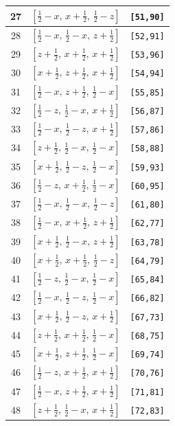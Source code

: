 \documentclass[fleqn,8pt]{jsarticle}
\begin{document}
\begin{longtable}{ccc}
27 & $\left[ \frac{1}{2} - x,\, x + \frac{1}{2},\, \frac{1}{2} - z \right]$ & {\tt [51,90]} \\ \hline
28 & $\left[ \frac{1}{2} - x,\, \frac{1}{2} - x,\, z + \frac{1}{2} \right]$ & {\tt [52,91]} \\ \hline
29 & $\left[ z + \frac{1}{2},\, x + \frac{1}{2},\, x + \frac{1}{2} \right]$ & {\tt [53,96]} \\ \hline
30 & $\left[ x + \frac{1}{2},\, z + \frac{1}{2},\, x + \frac{1}{2} \right]$ & {\tt [54,94]} \\ \hline
31 & $\left[ \frac{1}{2} - x,\, z + \frac{1}{2},\, \frac{1}{2} - x \right]$ & {\tt [55,85]} \\ \hline
32 & $\left[ \frac{1}{2} - z,\, \frac{1}{2} - x,\, x + \frac{1}{2} \right]$ & {\tt [56,87]} \\ \hline
33 & $\left[ \frac{1}{2} - x,\, \frac{1}{2} - z,\, x + \frac{1}{2} \right]$ & {\tt [57,86]} \\ \hline
34 & $\left[ z + \frac{1}{2},\, \frac{1}{2} - x,\, \frac{1}{2} - x \right]$ & {\tt [58,88]} \\ \hline
35 & $\left[ x + \frac{1}{2},\, \frac{1}{2} - z,\, \frac{1}{2} - x \right]$ & {\tt [59,93]} \\ \hline
36 & $\left[ \frac{1}{2} - z,\, x + \frac{1}{2},\, \frac{1}{2} - x \right]$ & {\tt [60,95]} \\ \hline
37 & $\left[ \frac{1}{2} - x,\, \frac{1}{2} - x,\, \frac{1}{2} - z \right]$ & {\tt [61,80]} \\ \hline
38 & $\left[ \frac{1}{2} - x,\, x + \frac{1}{2},\, z + \frac{1}{2} \right]$ & {\tt [62,77]} \\ \hline
39 & $\left[ x + \frac{1}{2},\, \frac{1}{2} - x,\, z + \frac{1}{2} \right]$ & {\tt [63,78]} \\ \hline
40 & $\left[ x + \frac{1}{2},\, x + \frac{1}{2},\, \frac{1}{2} - z \right]$ & {\tt [64,79]} \\ \hline
41 & $\left[ \frac{1}{2} - z,\, \frac{1}{2} - x,\, \frac{1}{2} - x \right]$ & {\tt [65,84]} \\ \hline
42 & $\left[ \frac{1}{2} - x,\, \frac{1}{2} - z,\, \frac{1}{2} - x \right]$ & {\tt [66,82]} \\ \hline
43 & $\left[ x + \frac{1}{2},\, \frac{1}{2} - z,\, x + \frac{1}{2} \right]$ & {\tt [67,73]} \\ \hline
44 & $\left[ z + \frac{1}{2},\, x + \frac{1}{2},\, \frac{1}{2} - x \right]$ & {\tt [68,75]} \\ \hline
45 & $\left[ x + \frac{1}{2},\, z + \frac{1}{2},\, \frac{1}{2} - x \right]$ & {\tt [69,74]} \\ \hline
46 & $\left[ \frac{1}{2} - z,\, x + \frac{1}{2},\, x + \frac{1}{2} \right]$ & {\tt [70,76]} \\ \hline
47 & $\left[ \frac{1}{2} - x,\, z + \frac{1}{2},\, x + \frac{1}{2} \right]$ & {\tt [71,81]} \\ \hline
48 & $\left[ z + \frac{1}{2},\, \frac{1}{2} - x,\, x + \frac{1}{2} \right]$ & {\tt [72,83]} \\
\end{longtable}
\end{document}
